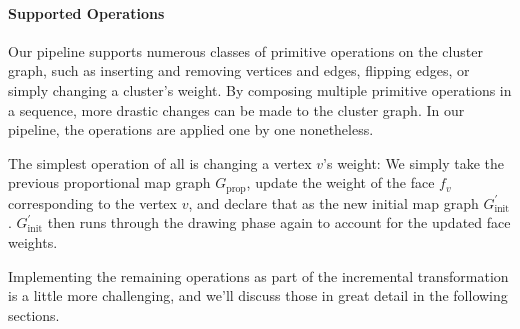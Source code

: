 \paragraph{Supported Operations}

Our pipeline supports numerous classes of primitive operations on the cluster graph, such as inserting and removing vertices and edges, flipping edges, or simply changing a cluster's weight.
By composing multiple primitive operations in a sequence, more drastic changes can be made to the cluster graph.
In our pipeline, the operations are applied one by one nonetheless.

The simplest operation of all is changing a vertex $v$'s weight: We simply take the previous proportional map graph $G_\text{prop}$, update the weight of the face $f_v$ corresponding to the vertex $v$, and declare that as the new initial map graph $G_\text{init}^\prime$.
$G_\text{init}^\prime$ then runs through the drawing phase again to account for the updated face weights.

Implementing the remaining operations as part of the incremental transformation is a little more challenging, and we'll discuss those in great detail in the following sections.

\clearpage

\clearpage

\clearpage

